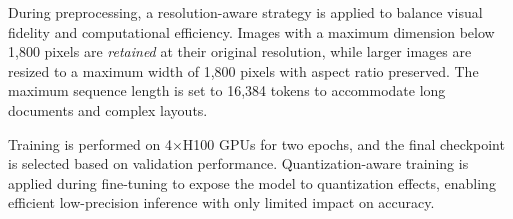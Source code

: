 \documentclass[]{typhoon} %
\begin{document}
During preprocessing, a resolution-aware strategy is applied to balance visual fidelity and computational efficiency. Images with a maximum dimension below 1,800 pixels are \emph{retained} at their original resolution, while larger images are resized to a maximum width of 1,800 pixels with aspect ratio preserved. The maximum sequence length is set to 16,384 tokens to accommodate long documents and complex layouts.

Training is performed on 4$\times$H100 GPUs for two epochs, and the final checkpoint is selected based on validation performance. Quantization-aware training \citep{Jacob_2018_CVPR} is applied during fine-tuning to expose the model to quantization effects, enabling efficient low-precision inference with only limited impact on accuracy.






\end{document}
